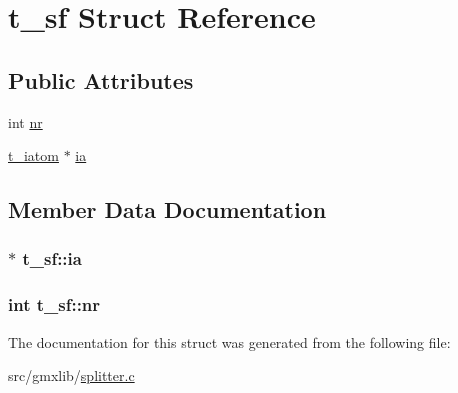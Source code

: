 \hypertarget{structt__sf}{\section{t\-\_\-sf \-Struct \-Reference}
\label{structt__sf}
}
\subsection*{\-Public \-Attributes}
\begin{DoxyCompactItemize}
\item 
int \hyperlink{structt__sf_adb4132dcf6d60dfc5f690ec97cf61bc0}{nr}
\item 
\hyperlink{include_2types_2idef_8h_abb1c069d34f868f1fa980a4c131ba249}{t\-\_\-iatom} $\ast$ \hyperlink{structt__sf_aeae2894b791ae83b28dc8832f5e1a413}{ia}
\end{DoxyCompactItemize}


\subsection{\-Member \-Data \-Documentation}
\hypertarget{structt__sf_aeae2894b791ae83b28dc8832f5e1a413}{
\subsubsection[{ia}]{$\ast$ {\bf t\-\_\-sf\-::ia}}}\label{structt__sf_aeae2894b791ae83b28dc8832f5e1a413}
\hypertarget{structt__sf_adb4132dcf6d60dfc5f690ec97cf61bc0}{
\subsubsection[{nr}]{\setlength{\rightskip}{0pt plus 5cm}int {\bf t\-\_\-sf\-::nr}}}\label{structt__sf_adb4132dcf6d60dfc5f690ec97cf61bc0}


\-The documentation for this struct was generated from the following file\-:\begin{DoxyCompactItemize}
\item 
src/gmxlib/\hyperlink{splitter_8c}{splitter.\-c}\end{DoxyCompactItemize}
